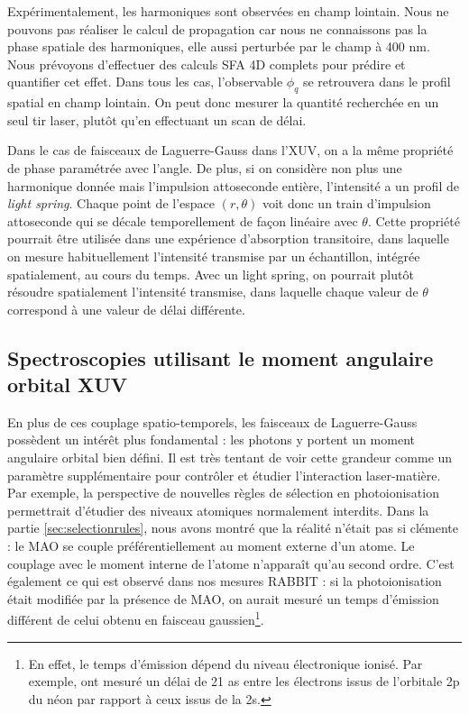 Expérimentalement, les harmoniques sont observées en champ lointain. Nous ne pouvons pas réaliser le calcul de propagation car nous ne connaissons pas la phase spatiale des harmoniques, elle aussi perturbée par le champ à 400 nm. Nous prévoyons d'effectuer des calculs SFA 4D complets pour prédire et quantifier cet effet. Dans tous les cas, l'observable $\phi_q$ se retrouvera dans le profil spatial en champ lointain. On peut donc mesurer la quantité recherchée en un seul tir laser, plutôt qu'en effectuant un scan de délai.

Dans le cas de faisceaux de Laguerre-Gauss dans l'XUV, on a la même propriété de phase paramétrée avec l'angle. De plus, si on considère non plus une harmonique donnée mais l'impulsion attoseconde entière, l'intensité a un profil de \textit{light spring}. Chaque point de l'espace $(r,\theta)$ voit donc un train d'impulsion attoseconde qui se décale temporellement de façon linéaire avec $\theta$. Cette propriété pourrait être utilisée dans une expérience d'absorption transitoire, dans laquelle on mesure habituellement l'intensité transmise par un échantillon, intégrée spatialement, au cours du temps. Avec un light spring, on pourrait plutôt résoudre spatialement l'intensité transmise, dans laquelle chaque valeur de $\theta$ correspond à une valeur de délai différente.

\subsection{Spectroscopies utilisant le moment angulaire orbital XUV}
En plus de ces couplage spatio-temporels, les faisceaux de Laguerre-Gauss possèdent un intérêt plus fondamental : les photons y portent un moment angulaire orbital bien défini. Il est très tentant de voir cette grandeur comme un paramètre supplémentaire pour contrôler et étudier l'interaction laser-matière. Par exemple, la perspective de nouvelles règles de sélection en photoionisation permettrait d'étudier des niveaux atomiques normalement interdits. Dans la partie \ref{sec:selectionrules}, nous avons montré que la réalité n'était pas si clémente : le MAO se couple préférentiellement au moment externe d'un atome. Le couplage avec le moment interne de l'atome n'apparaît qu'au second ordre. C'est également ce qui est observé dans nos mesures RABBIT : si la photoionisation était modifiée par la présence de MAO, on aurait mesuré un temps d'émission différent de celui obtenu en faisceau gaussien\footnote{En effet, le temps d'émission dépend du niveau électronique ionisé. Par exemple,  ont mesuré un délai de 21 as entre les électrons issus de l'orbitale 2p du néon par rapport à ceux issus de la 2s.}.

